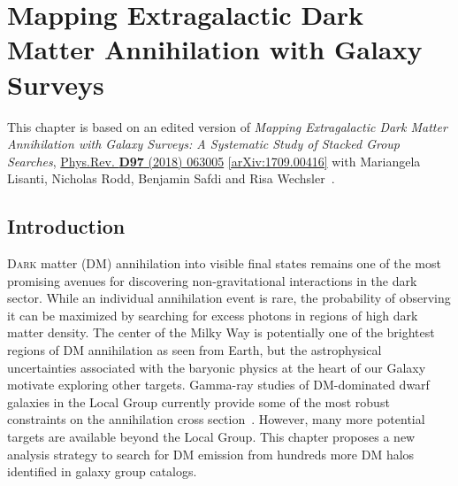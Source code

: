 \chapter{Mapping Extragalactic Dark Matter Annihilation with Galaxy Surveys}
\label{ch:groups_sim}

This chapter is based on an edited version of \emph{Mapping Extragalactic Dark Matter Annihilation with Galaxy Surveys: A Systematic Study of Stacked Group Searches},  \href{https://journals.aps.org/prd/abstract/10.1103/PhysRevD.97.063005}{Phys.Rev. \textbf{D97} (2018) 063005} \href{https://arxiv.org/abs/1709.00416}{[arXiv:1709.00416]} with Mariangela Lisanti, Nicholas Rodd, Benjamin Safdi and Risa Wechsler~\cite{Lisanti:2017qoz}.

\section{Introduction}

\lettrine[lines=4]{D}{ark} matter (DM) annihilation into visible final states remains one of the most promising avenues for discovering non-gravitational interactions in the dark sector.  While an individual annihilation event is rare, the probability of observing it can be maximized by searching for excess photons in regions of high dark matter density.  The center of the Milky Way is potentially one of the brightest regions of DM annihilation as seen from Earth, but the astrophysical uncertainties associated with the baryonic physics at the heart of our Galaxy motivate exploring other targets.  Gamma-ray studies of DM-dominated dwarf galaxies in the Local Group currently provide some of the most robust constraints on the annihilation cross section~\cite{Fermi-LAT:2016uux, Ackermann:2015zua}.  However, many more potential targets are available beyond the Local Group.  This chapter proposes a new analysis strategy to search for DM emission from hundreds more DM halos identified in galaxy group catalogs.  

